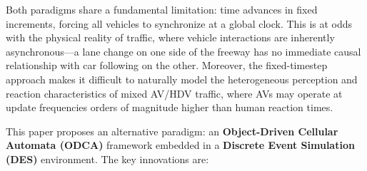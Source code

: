 \documentclass[review,authoryear]{elsarticle}
\begin{document}
Both paradigms share a fundamental limitation: time advances in fixed increments, forcing all vehicles to synchronize at a global clock. This is at odds with the physical reality of traffic, where vehicle interactions are inherently asynchronous---a lane change on one side of the freeway has no immediate causal relationship with car following on the other. Moreover, the fixed-timestep approach makes it difficult to naturally model the heterogeneous perception and reaction characteristics of mixed AV/HDV traffic, where AVs may operate at update frequencies orders of magnitude higher than human reaction times.

This paper proposes an alternative paradigm: an \textbf{Object-Driven Cellular Automata (ODCA)} framework embedded in a \textbf{Discrete Event Simulation (DES)} environment. The key innovations are:
\end{document}
